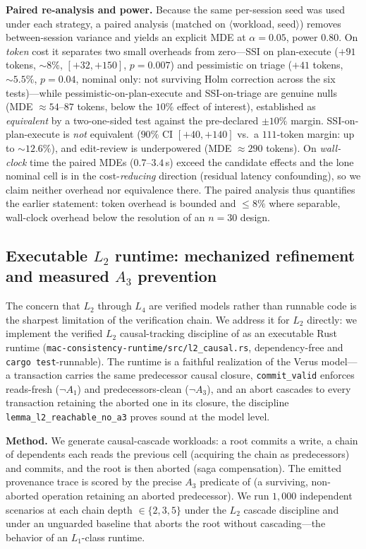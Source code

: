 \documentclass[journal,compsoc,10pt]{IEEEtran}
\theoremstyle{definition}
\theoremstyle{remark}
\begin{document}
\medskip
\noindent\textbf{Paired re-analysis and power.}
Because the same per-session seed was used under each strategy, a paired
analysis (matched on $\langle$workload, seed$\rangle$) removes
between-session variance and yields an explicit MDE at $\alpha{=}0.05$,
power $0.80$. On \emph{token} cost it separates two small overheads from
zero---SSI on plan-execute ($+91$ tokens, ${\sim}8\%$, $[+32,+150]$,
$p{=}0.007$) and pessimistic on triage ($+41$ tokens, ${\sim}5.5\%$,
$p{=}0.04$, nominal only: not surviving Holm correction across the six
tests)---while pessimistic-on-plan-execute and SSI-on-triage are genuine
nulls (MDE $\approx 54$--$87$ tokens, below the $10\%$ effect of interest),
established as \emph{equivalent} by a two-one-sided test against the
pre-declared $\pm10\%$ margin. SSI-on-plan-execute is \emph{not} equivalent
($90\%$ CI $[+40,+140]$ vs.\ a $111$-token margin: up to ${\sim}12.6\%$),
and edit-review is underpowered (MDE $\approx 290$ tokens). On
\emph{wall-clock} time the paired MDEs ($0.7$--$3.4$\,s) exceed the
candidate effects and the lone nominal cell is in the cost-\emph{reducing}
direction (residual latency confounding), so we claim neither overhead nor
equivalence there. The paired analysis thus quantifies the earlier
statement: token overhead is bounded and $\leq 8\%$ where separable,
wall-clock overhead below the resolution of an $n{=}30$ design.

\subsection{Executable $L_2$ runtime: mechanized refinement and measured $A_3$ prevention}
\label{sec:l2-deployed}

The concern that $L_2$ through $L_4$ are verified models rather than
runnable code is the sharpest limitation of the verification chain. We
address it for $L_2$ directly: we implement the verified $L_2$
causal-tracking discipline of  as an executable Rust
runtime (\texttt{mac-consistency-runtime/src/l2\_causal.rs}, dependency-free
and \texttt{cargo test}-runnable). The runtime is a faithful realization of
the Verus model---a transaction carries the same predecessor causal closure,
\texttt{commit\_valid} enforces reads-fresh ($\neg A_1$) and
predecessors-clean ($\neg A_3$), and an abort cascades to every transaction
retaining the aborted one in its closure, the discipline
\texttt{lemma\_l2\_reachable\_no\_a3} proves sound at the model level.

\medskip
\noindent\textbf{Method.}
We generate causal-cascade workloads: a root commits a write, a chain of
dependents each reads the previous cell (acquiring the chain as
predecessors) and commits, and the root is then aborted (saga
compensation). The emitted provenance trace is scored by the precise $A_3$
predicate of  (a surviving, non-aborted operation retaining an
aborted predecessor). We run $1{,}000$ independent scenarios at each chain
depth $\in \{2,3,5\}$ under the $L_2$ cascade discipline and under an
unguarded baseline that aborts the root without cascading---the behavior of
an $L_1$-class runtime.
\end{document}
